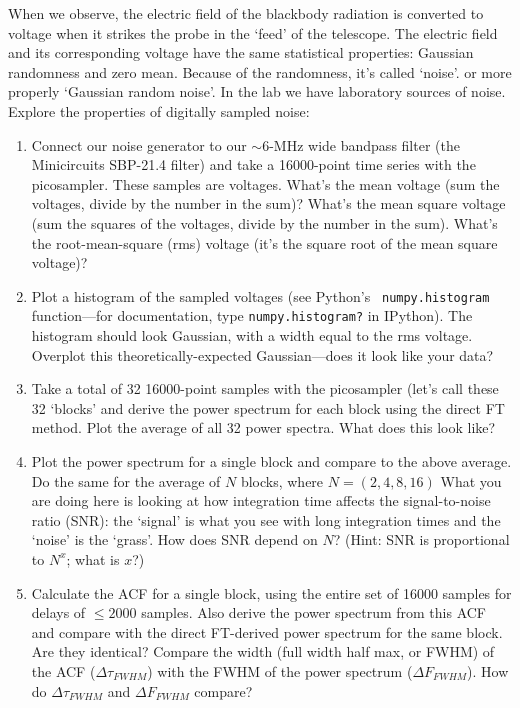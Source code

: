 \documentclass[12pt,preprint]{aastex}
\begin{document}
When we observe, the electric field of the blackbody radiation is
converted to voltage when it strikes the probe in the `feed' of the
telescope. The electric field and its corresponding voltage have the
same statistical properties: Gaussian randomness and zero mean. Because
of the randomness, it's called `noise'. or more properly `Gaussian
random noise'. In the lab we have laboratory sources of noise. Explore
the properties of digitally sampled noise: \begin{enumerate}

\item Connect our noise generator to our $\sim 6$-MHz wide bandpass
  filter (the Minicircuits SBP-21.4 filter) and take a 16000-point time
  series with the picosampler. These samples are voltages. What's the
  mean voltage (sum the voltages, divide by the number in the sum)?
  What's the mean square voltage (sum the squares of the voltages,
  divide by the number in the sum). What's the root-mean-square (rms)
  voltage (it's the square root of the mean square voltage)?

\item Plot a histogram of the sampled voltages (see Python's {\tt
  numpy.histogram} function---for documentation, type {\tt numpy.histogram?} in IPython).
  The histogram
  should look Gaussian, with a width equal to the rms
  voltage. Overplot this theoretically-expected Gaussian---does it look
  like your data?

\item Take a total of 32 16000-point samples with the picosampler (let's
  call these 32 `blocks' and derive the power spectrum for each block
  using the direct FT method. Plot the average of all 32 power
  spectra. What does this look like?

\item Plot the power spectrum for a single block and compare to the
  above average. Do the same for the average of $N$ blocks, where $N=(2,
  4, 8, 16)$ What you are doing here is looking at how integration time
  affects the signal-to-noise ratio (SNR): the `signal' is what you see
  with long integration times and the `noise' is the `grass'. How does
  SNR depend on $N$? (Hint: SNR is proportional to $N^x$; what is $x$?)

\item Calculate the ACF for a single block, using the entire set of
  16000 samples for delays of $\le 2000$ samples. Also derive the power
  spectrum from this ACF and compare with the direct FT-derived power
  spectrum for the same block.  Are they identical?
  Compare the width (full width half max, or FWHM) of the ACF ($\Delta
  \tau_{FWHM}$) with the FWHM of the power spectrum ($\Delta
  F_{FWHM}$). How do $\Delta \tau_{FWHM}$ and $\Delta F_{FWHM}$ compare?
\end{enumerate}
\end{document}
